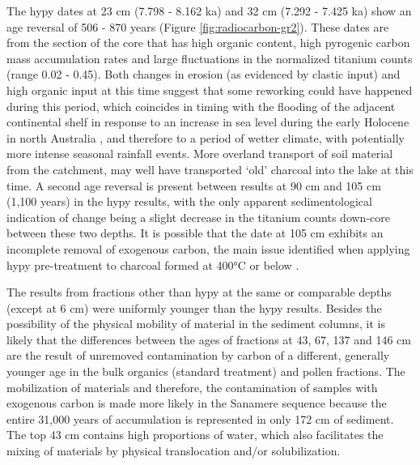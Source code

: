 \documentclass[
  12pt,
]{book}
\begin{document}
The hypy dates at 23 cm (7.798 - 8.162 ka) and 32 cm (7.292 - 7.425 ka) show an age reversal of 506 - 870 years (Figure \ref{fig:radiocarbon-gr2}). These dates are from the section of the core that has high organic content, high pyrogenic carbon mass accumulation rates and large fluctuations in the normalized titanium counts (range 0.02 - 0.45). Both changes in erosion (as evidenced by clastic input) and high organic input at this time suggest that some reworking could have happened during this period, which coincides in timing with the flooding of the adjacent continental shelf in response to an increase in sea level during the early Holocene in north Australia \citep{slossHoloceneSealevelChange2018a, chivasSealevelEnvironmentalChanges2001, yokoyamaShorelineReconstructionAustralia2001, reevesPalaeoenvironmentalChangeTropical2013}, and therefore to a period of wetter climate, with potentially more intense seasonal rainfall events. More overland transport of soil material from the catchment, may well have transported `old' charcoal into the lake at this time. A second age reversal is present between results at 90 cm and 105 cm (1,100 years) in the hypy results, with the only apparent sedimentological indication of change being a slight decrease in the titanium counts down-core between these two depths. It is possible that the date at 105 cm exhibits an incomplete removal of exogenous carbon, the main issue identified when applying hypy pre-treatment to charcoal formed at 400°C or below \citep{birdEfficiencyCharcoalDecontamination2014}.

The results from fractions other than hypy at the same or comparable depths (except at 6 cm) were uniformly younger than the hypy results. Besides the possibility of the physical mobility of material in the sediment columns, it is likely that the differences between the ages of fractions at 43, 67, 137 and 146 cm are the result of unremoved contamination by carbon of a different, generally younger age in the bulk organics (standard treatment) and pollen fractions. The mobilization of materials and therefore, the contamination of samples with exogenous carbon is made more likely in the Sanamere sequence because the entire 31,000 years of accumulation is represented in only 172 cm of sediment. The top 43 cm contains high proportions of water, which also facilitates the mixing of materials by physical translocation and/or solubilization.
\end{document}
